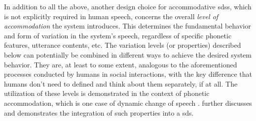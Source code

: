 In addition to all the above, another design choice for accommodative \acp{sds}, which is not explicitly required in human speech, concerns the overall \emph{level of accommodation} the system introduces.
This determines the fundamental behavior and form of variation in the system's speech, regardless of specific phonetic features, utterance contents, etc.
The variation levels (or properties) described below can potentially be combined in different ways to achieve the desired system behavior.
They are, at least to some extent, analogous to the aforementioned processes conducted by humans in social interactions, with the key difference that humans don't need to defined and think about them separately, if at all.
The utilization of these levels is demonstrated in the context of phonetic accommodation, which is one case of dynamic change of speech \citep[as in][to name a few]{Weise2019individual, Schweitzer2016exemplar, Bevnuvs2014social}.
 further discusses and demonstrates the integration of such properties into a \ac{sds}.

